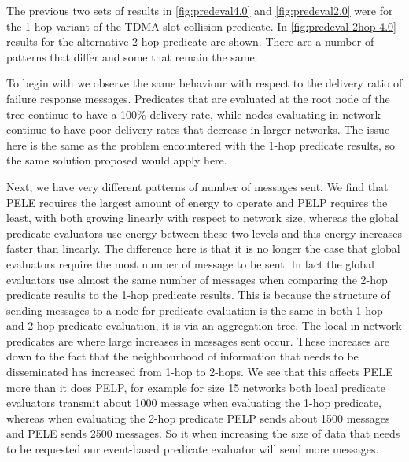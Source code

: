 The previous two sets of results in \autoref{fig:predeval4.0} and \autoref{fig:predeval2.0} were for the 1-hop variant of the TDMA slot collision predicate. In \autoref{fig:predeval-2hop-4.0} results for the alternative 2-hop predicate are shown. There are a number of patterns that differ and some that remain the same.

To begin with we observe the same behaviour with respect to the delivery ratio of failure response messages. Predicates that are evaluated at the root node of the tree continue to have a 100\% delivery rate, while nodes evaluating in-network continue to have poor delivery rates that decrease in larger networks. The issue here is the same as the problem encountered with the 1-hop predicate results, so the same solution proposed would apply here.

Next, we have very different patterns of number of messages sent. We find that PELE requires the largest amount of energy to operate and PELP requires the least, with both growing linearly with respect to network size, whereas the global predicate evaluators use energy between these two levels and this energy increases faster than linearly. The difference here is that it is no longer the case that global evaluators require the most number of message to be sent. In fact the global evaluators use almost the same number of messages when comparing the 2-hop predicate results to the 1-hop predicate results. This is because the structure of sending messages to a node for predicate evaluation is the same in both 1-hop and 2-hop predicate evaluation, it is via an aggregation tree. The local in-network predicates are where large increases in messages sent occur. These increases are down to the fact that the neighbourhood of information that needs to be disseminated has increased from 1-hop to 2-hops. We see that this affects PELE more than it does PELP, for example for size 15 networks both local predicate evaluators transmit about 1000 message when evaluating the 1-hop predicate, whereas when evaluating the 2-hop predicate PELP sends about 1500 messages and PELE sends 2500 messages. So it when increasing the size of data that needs to be requested our event-based predicate evaluator will send more messages.


